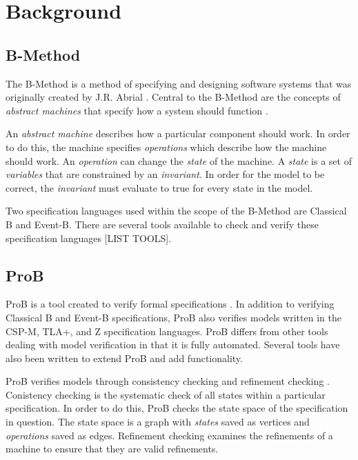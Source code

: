 \section{Background}

\subsection{B-Method}

The B-Method is a method of specifying and designing software systems that was originally created by J.R. Abrial \cite{abrial2005b}. Central to the B-Method are the concepts of \emph{abstract machines} that specify how a system should function \cite{schneider2001b}.

An \emph{abstract machine} describes how a particular component should work. In order to do this, the machine specifies \emph{operations} which describe how the machine should work. An \emph{operation} can change the \emph{state} of the machine. A \emph{state} is a set of \emph{variables} that are constrained by an \emph{invariant}. In order for the model to be correct, the \emph{invariant} must evaluate to true for every state in the model.

Two specification languages used within the scope of the B-Method are Classical B and Event-B. There are several tools available to check and verify these specification languages [LIST TOOLS].

\subsection{ProB}

ProB is a tool created to verify formal specifications \cite{LeBu08_225}. In addition to verifying Classical B and Event-B specifications, ProB also verifies models written in the CSP-M, TLA+, and Z specification languages. ProB differs from other tools dealing with model verification in that it is fully automated. Several tools have also been written to extend ProB and add functionality.

ProB verifies models through consistency checking \cite{LeBu03_32} and refinement checking \cite{LeBu05_5}. Conistency checking is the systematic check of all states within a particular specification. In order to do this, ProB checks the state space of the specification in question. The state space is a graph with \emph{states} saved as vertices and \emph{operations} saved as edges. Refinement checking examines the refinements of a machine to ensure that they are valid refinements.

